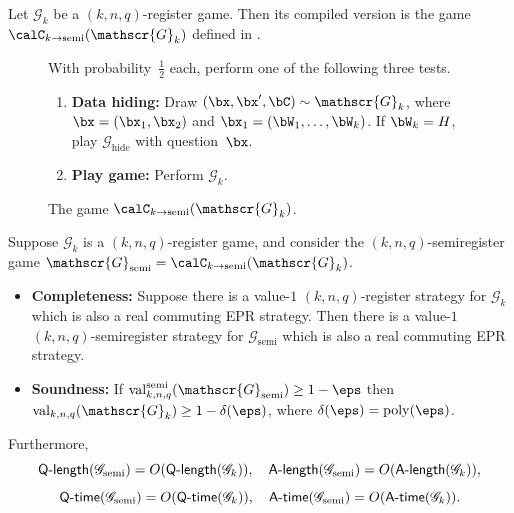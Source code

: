 \documentclass[11pt]{article}
\newcommand{\hideq}{H}
\newcommand{\game}{\mathscr{G}}
\newcommand{\valreg}[2]{\mathrm{val}_{#1}(#2)}
\newcommand{\valsemi}[2]{\mathrm{val}_{#1}^{\mathrm{semi}}(#2)}
\newcommand{\qtime}[1]{\mathsf{Q}\textnormal{-}\mathsf{time}(#1)}
\newcommand{\atime}[1]{\mathsf{A}\textnormal{-}\mathsf{time}(#1)}
\newcommand{\qlength}[1]{\mathsf{Q}\textnormal{-}\mathsf{length}(#1)}
\newcommand{\alength}[1]{\mathsf{A}\textnormal{-}\mathsf{length}(#1)}
\begin{document}
\begin{definition}
Let $\game_k$ be a $(k, n, q)$-register game.
Then its compiled version is the game $\calC_{k \rightarrow \mathrm{semi}}(\game_k)$ defined in .
\end{definition}
{
\begin{figure}
With probability~$\tfrac{1}{2}$ each, perform one of the following three tests.
\begin{enumerate}
	\item \textbf{Data hiding:} Draw $(\bx, \bx', \bC) \sim \game_k$, where $\bx = (\bx_1, \bx_2)$ and $\bx_1 = (\bW_1, \ldots, \bW_k)$.
			 If $\bW_k = \hideq$, play $\game_{\mathrm{hide}}$ with question~$\bx$.\label{item:data-hiding}
	\item \textbf{Play game:} Perform $\game_{k}$.\label{item:play-ball!}
	\end{enumerate}
	\caption{The game $\calC_{k \rightarrow \mathrm{semi}}(\game_k)$.\label{fig:two-to-one}}
\end{figure}
}

\begin{theorem}\label{theorem:two-to-one-compiler}
Suppose $\game_k$ is a $(k, n, q)$-register game,
and consider the $(k, n, q)$-semiregister game $\game_{\mathrm{semi}} = \calC_{k \rightarrow \mathrm{semi}}(\game_k)$.
\begin{itemize}
\item[$\circ$] \textbf{Completeness:} 
	Suppose there is a value-$1$ $(k,n,q)$-register strategy for $\game_{k}$ which is also a real commuting EPR strategy.
	Then there is a value-$1$ $(k,n,q)$-semiregister strategy for $\game_{\mathrm{semi}}$ which is also a real commuting EPR strategy.
\item[$\circ$] \textbf{Soundness:} If $\valsemi{k,n,q}{\game_{\mathrm{semi}}} \geq 1-\eps$ then $\valreg{k,n,q}{\game_{k}} \geq 1 -\delta(\eps)$, where $\delta(\eps) = \mathrm{poly}(\eps)$.
\end{itemize}
Furthermore,
\begin{equation*}
\qlength{\game_{\mathrm{semi}}} = O(\qlength{\game_k}), \quad
\alength{\game_{\mathrm{semi}}} = O(\alength{\game_k}),
\end{equation*}
\begin{equation*}
\qtime{\game_{\mathrm{semi}}} = O(\qtime{\game_k}), \quad
\atime{\game_{\mathrm{semi}}} = O(\atime{\game_k}).
\end{equation*}
\end{theorem}
\end{document}
